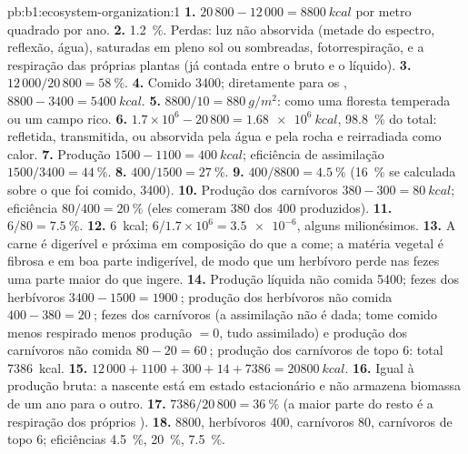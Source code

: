 \begin{solution}{pb:b1:ecosystem-organization:1}
\textbf{1.} $20\,800 - 12\,000 = \qty{8800}{kcal}$ por metro quadrado
por ano.
\textbf{2.} \qty{1.2}{\%}. Perdas: luz não absorvida (metade do
espectro, reflexão, água),  saturadas em pleno sol ou
sombreadas, fotorrespiração, e a respiração das próprias plantas (já
contada entre o bruto e o líquido).
\textbf{3.} $12\,000/20\,800 = \qty{58}{\%}$.
\textbf{4.} Comido \qty{3400}{}; diretamente para os ,
$8800 - 3400 = \qty{5400}{kcal}$.
\textbf{5.} $8800/10 = \qty{880}{g/m^2}$: como uma floresta temperada
ou um campo rico.
\textbf{6.} $1.7\times 10^6 - 20\,800 = \qty{1.68e6}{kcal}$, \qty{98.8}{\%}
do total: refletida, transmitida, ou absorvida pela água e pela rocha
e reirradiada como calor.
\textbf{7.} Produção $1500 - 1100 = \qty{400}{kcal}$; eficiência de
assimilação $1500/3400 = \qty{44}{\%}$.
\textbf{8.} $400/1500 = \qty{27}{\%}$.
\textbf{9.} $400/8800 = \qty{4.5}{\%}$ (\qty{16}{\%} se calculada sobre
o que foi comido, \qty{3400}{}).
\textbf{10.} Produção dos carnívoros $380 - 300 = \qty{80}{kcal}$;
eficiência $80/400 = \qty{20}{\%}$ (eles comeram \qty{380}{} dos
\qty{400}{} produzidos).
\textbf{11.} $6/80 = \qty{7.5}{\%}$.
\textbf{12.} \qty{6}{kcal}; $6/1.7\times 10^6 = \num{3.5e-6}$, alguns
milionésimos.
\textbf{13.} A carne é digerível e próxima em composição do que a
come; a matéria vegetal é fibrosa e em boa parte indigerível, de modo
que um herbívoro perde nas fezes uma parte maior do que ingere.
\textbf{14.} Produção líquida não comida \qty{5400}{}; fezes dos
herbívoros $3400 - 1500 = \qty{1900}{}$; produção dos herbívoros não
comida $400 - 380 = \qty{20}{}$; fezes dos carnívoros (a assimilação
não é dada; tome comido menos respirado menos produção $= 0$, tudo
assimilado) e produção dos carnívoros não comida $80 - 20 = \qty{60}{}$;
produção dos carnívoros de topo \qty{6}{}: total \qty{7386}{kcal}.
\textbf{15.} $12\,000 + 1100 + 300 + 14 + 7386 = \qty{20800}{kcal}$.
\textbf{16.} Igual à produção bruta: a nascente está em estado
estacionário e não armazena biomassa de um ano para o outro.
\textbf{17.} $7386/20\,800 = \qty{36}{\%}$ (a maior parte do resto é a
respiração dos próprios ).
\textbf{18.}  \qty{8800}{}, herbívoros \qty{400}{},
carnívoros \qty{80}{}, carnívoros de topo \qty{6}{}; eficiências
\qty{4.5}{\%}, \qty{20}{\%}, \qty{7.5}{\%}.

\end{solution}

